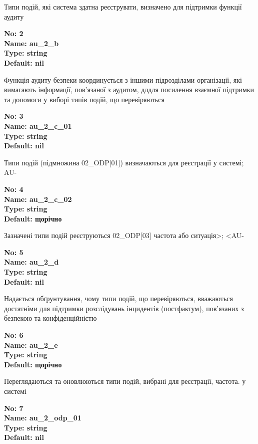 \documentclass{article}
\begin{document}
{\footnotesize Типи подій, які система здатна реєструвати, визначено для підтримки функції аудиту}


{\footnotesize\bfseries
No: 2\\
Name: au\_\allowbreak{}2\_\allowbreak{}b\\
Type: string\\
Default: nil
}

{\footnotesize Функція аудиту безпеки координується з іншими підрозділами організації, які вимагають інформації, пов'язаної з аудитом, длдля посилення взаємної підтримки та допомоги у виборі типів подій, що перевіряються}


{\footnotesize\bfseries
No: 3\\
Name: au\_\allowbreak{}2\_\allowbreak{}c\_\allowbreak{}01\\
Type: string\\
Default: nil
}

{\footnotesize Типи подій (підмножина 02\_\allowbreak{}ODP[01]) визначаються для реєстрації у системі; AU-}


{\footnotesize\bfseries
No: 4\\
Name: au\_\allowbreak{}2\_\allowbreak{}c\_\allowbreak{}02\\
Type: string\\
Default: \textquotedbl{}щорічно\textquotedbl{}
}

{\footnotesize Зазначені типи подій реєструються 02\_\allowbreak{}ODP[03] частота або ситуація>; <AU-}


{\footnotesize\bfseries
No: 5\\
Name: au\_\allowbreak{}2\_\allowbreak{}d\\
Type: string\\
Default: nil
}

{\footnotesize Надається обґрунтування, чому типи подій, що перевіряються, вважаються достатніми для підтримки розслідувань інцидентів (постфактум), пов'язаних з безпекою та конфіденційністю}


{\footnotesize\bfseries
No: 6\\
Name: au\_\allowbreak{}2\_\allowbreak{}e\\
Type: string\\
Default: \textquotedbl{}щорічно\textquotedbl{}
}

{\footnotesize Переглядаються та оновлюються типи подій, вибрані для реєстрації, частота. у системі}


{\footnotesize\bfseries
No: 7\\
Name: au\_\allowbreak{}2\_\allowbreak{}odp\_\allowbreak{}01\\
Type: string\\
Default: nil
}
\end{document}
